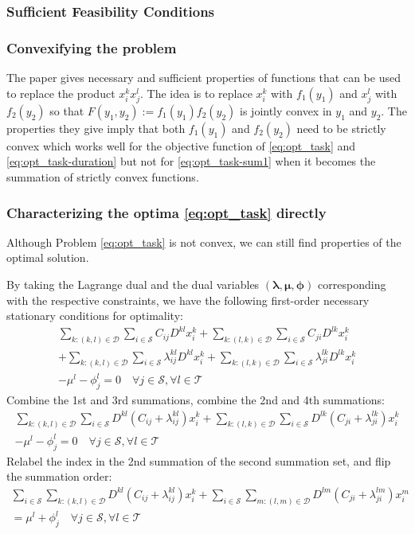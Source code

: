 \subsubsection{Sufficient Feasibility Conditions} \todo{}

\subsubsection{Convexifying the problem} The paper \cite{gounaris2008convexity} gives necessary and sufficient properties of functions that can be used to replace the product $x_i^kx_j^l$.
The idea is to replace $x_i^k$ with $f_1(y_1)$ and $x_j^l$ with $f_2(y_2)$ so that $F(y_1,y_2):=f_1(y_1)f_2(y_2)$ is jointly convex in $y_1$ and $y_2$.
The properties they give imply that both $f_1(y_1)$ and $f_2(y_2)$ need to be strictly convex which works well for the objective function of \eqref{eq:opt_task} and \eqref{eq:opt_task-duration} but not for \eqref{eq:opt_task-sum1} when it becomes the summation of strictly convex functions.

\subsubsection{Characterizing the optima \eqref{eq:opt_task} directly}
Although Problem \eqref{eq:opt_task} is not convex, we can still find properties of the optimal solution.

By taking the Lagrange dual and the dual variables $(\boldsymbol{\lambda},\boldsymbol{\mu},\boldsymbol{\phi})$ corresponding with the respective constraints, we have the following first-order necessary stationary conditions for optimality:
\begin{align}
	\sum_{k:(k,l)\in\mathcal{D}}\sum_{i\in\mathcal{S}}C_{ij}D^{kl}x_i^k + \sum_{k:(l,k)\in\mathcal{D}}\sum_{i\in\mathcal{S}}C_{ji}D^{lk}x_i^k \nonumber \\
	+ \sum_{k:(k,l)\in\mathcal{D}}\sum_{i\in\mathcal{S}}\lambda_{ij}^{kl}D^{kl}x_i^k + \sum_{k:(l,k)\in\mathcal{D}}\sum_{i\in\mathcal{S}}\lambda_{ji}^{lk}D^{lk}x_i^k \nonumber \\
	- \mu^l - \phi_j^l = 0
	\quad \forall j\in\mathcal{S},\forall l\in\mathcal{T} \nonumber
\end{align}
Combine the 1st and 3rd summations, combine the 2nd and 4th summations:
\begin{align}
	\sum_{k:(k,l)\in\mathcal{D}}\sum_{i\in\mathcal{S}} D^{kl}(C_{ij} + \lambda_{ij}^{kl})x_i^k
	+ \sum_{k:(l,k)\in\mathcal{D}}\sum_{i\in\mathcal{S}} D^{lk}(C_{ji} + \lambda_{ji}^{lk})x_i^k \nonumber \\
	- \mu^l - \phi_j^l = 0
	\quad \forall j\in\mathcal{S},\forall l\in\mathcal{T} \nonumber
\end{align}
Relabel the index in the 2nd summation of the second summation set, and flip the summation order:
\begin{align}
	\sum_{i\in\mathcal{S}}\sum_{k:(k,l)\in\mathcal{D}} D^{kl}(C_{ij} + \lambda_{ij}^{kl})x_i^k
	+ \sum_{i\in\mathcal{S}}\sum_{m:(l,m)\in\mathcal{D}} D^{lm}(C_{ji} + \lambda_{ji}^{lm})x_i^m \nonumber \\
	= \mu^l + \phi_j^l
	\quad \forall j\in\mathcal{S},\forall l\in\mathcal{T} \label{eq:cond_stat}
\end{align}

